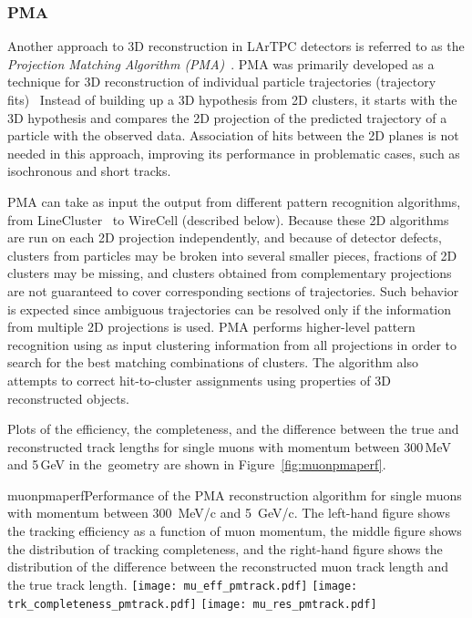 \subsubsection{PMA}

Another approach to 3D reconstruction in LArTPC detectors is referred to as the \textit{Projection Matching Algorithm
(PMA)}~\cite{pma_algorithm}. PMA was primarily developed as a technique for 3D reconstruction
of individual particle trajectories (trajectory fits)~\cite{pma_algorithm} %
Instead of
building up a 3D hypothesis from 2D clusters, it starts with the 3D hypothesis and compares
the 2D projection of the predicted trajectory of a particle with the observed data. Association
of hits between the 2D planes is not needed in this approach, improving its performance in
problematic cases, such as isochronous and short tracks.

PMA can take as input the output from different pattern recognition algorithms, from
LineCluster~\cite{linecluster} to WireCell (described below).  Because these 2D algorithms
are run on each 2D projection independently, and because of detector defects,
clusters from  particles may be broken
into several smaller pieces, fractions of 2D clusters may be missing,
and clusters obtained from complementary projections are not guaranteed to cover corresponding
sections of trajectories. Such behavior is expected since ambiguous 
trajectories can be resolved only if the information from multiple 2D projections is used.
PMA performs higher-level pattern recognition using as input clustering information from all
projections in order to search for the best matching combinations of clusters. The algorithm
also attempts to correct hit-to-cluster assignments using properties of 3D reconstructed objects.

Plots of the efficiency, the completeness, and the  difference between the true and reconstructed
track lengths for single muons with momentum between 300\,MeV and 5\,GeV in the~\pdsp geometry are
shown in Figure~\ref{fig:muonpmaperf}.  

\begin{cdrfigure}{muonpmaperf}{Performance of the PMA reconstruction algorithm for single muons with 
momentum between 300~MeV/c and 5~GeV/c.  The left-hand figure shows the tracking efficiency as a function of
muon momentum, the middle figure shows the distribution of tracking completeness, and the right-hand figure shows the
distribution of the difference between the reconstructed muon track length and the true track length.}
\texttt{[image: mu\_eff\_pmtrack.pdf]}
\texttt{[image: trk\_completeness\_pmtrack.pdf]}
\texttt{[image: mu\_res\_pmtrack.pdf]}
\end{cdrfigure}

